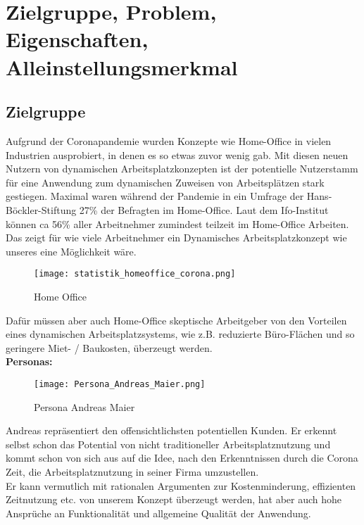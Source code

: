 \section{Zielgruppe, Problem, Eigenschaften, Alleinstellungsmerkmal}

\subsection{Zielgruppe}

Aufgrund der Coronapandemie wurden Konzepte wie Home-Office in vielen Industrien ausprobiert, in denen es so etwas zuvor wenig gab.
Mit diesen neuen Nutzern von dynamischen Arbeitsplatzkonzepten ist der potentielle Nutzerstamm für eine Anwendung zum dynamischen Zuweisen von Arbeitsplätzen stark gestiegen.
Maximal waren während der Pandemie in ein Umfrage der Hans-Böckler-Stiftung 27\% der Befragten im Home-Office.
Laut dem Ifo-Institut können ca 56\% aller Arbeitnehmer zumindest teilzeit im Home-Office Arbeiten. 
Das zeigt für wie viele Arbeitnehmer ein Dynamisches Arbeitsplatzkonzept wie unseres eine Möglichkeit wäre.

\begin{figure}[!h]
    \centering
    \texttt{[image: statistik\_homeoffice\_corona.png]}
    \caption{Home Office}
    \label{fig:HomeOffice}
\end{figure}

Dafür müssen aber auch Home-Office skeptische Arbeitgeber von den Vorteilen eines dynamischen Arbeitsplatzsystems, wie z.B. reduzierte Büro-Flächen und so geringere Miet- / Baukosten, überzeugt werden.
\pagebreak
\\
\textbf{Personas: }

\begin{figure}[!h]
    \centering
    \texttt{[image: Persona\_Andreas\_Maier.png]}
    \caption{Persona Andreas Maier}
    \label{fig:PersonaAndreasMaier}
\end{figure}

Andreas repräsentiert den offensichtlichsten potentiellen Kunden.
Er erkennt selbst schon das Potential von nicht traditioneller Arbeitsplatznutzung und kommt schon von sich aus auf die Idee, nach den Erkenntnissen durch die Corona Zeit, die Arbeitsplatznutzung in seiner Firma umzustellen.\\
Er kann vermutlich mit rationalen Argumenten zur Kostenminderung, effizienten Zeitnutzung etc. von unserem Konzept überzeugt werden, hat aber auch hohe Ansprüche an Funktionalität und allgemeine Qualität der Anwendung.

